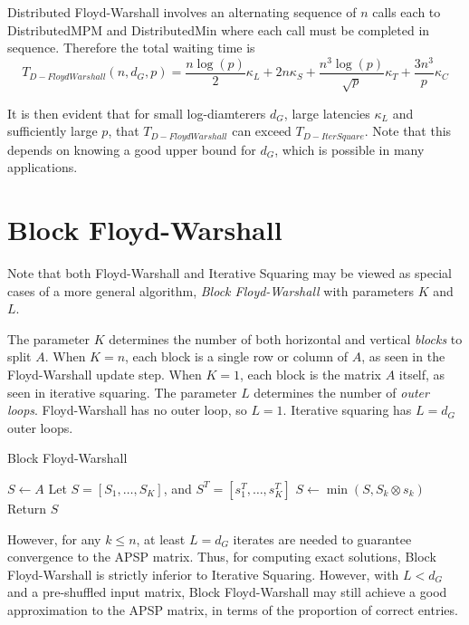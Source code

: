 \documentclass{article} %
\begin{document}
Distributed Floyd-Warshall involves an alternating sequence of $n$ calls each to {\sc DistributedMPM} and {\sc DistributedMin}
where each call must be completed in sequence.  Therefore the total waiting time is
\[
T_{D-FloydWarshall}(n, d_G, p) =  \frac{n \log(p)}{2}\kappa_L + 2n\kappa_S +  \frac{n^3\log(p)}{\sqrt{p}}\kappa_T + \frac{3n^3}{p}\kappa_C
\]

It is then evident that for small log-diamterers $d_G$, large
latencies $\kappa_L$ and sufficiently large $p$, that
$T_{D-FloydWarshall}$ can exceed $T_{D-IterSquare}$.  Note that this
depends on knowing a good upper bound for $d_G$, which is possible in
many applications.

\section{Block Floyd-Warshall}

Note that both Floyd-Warshall and Iterative Squaring may be viewed as
special cases of a more general algorithm, \emph{Block Floyd-Warshall}
with parameters $K$ and $L$.

The parameter $K$ determines the number of both horizontal and
vertical \emph{blocks} to split $A$.  When $K = n$, each block is a
single row or column of $A$, as seen in the Floyd-Warshall update
step.  When $K = 1$, each block is the matrix $A$ itself, as seen in
iterative squaring.  The parameter $L$ determines the number of
\emph{outer loops}.  Floyd-Warshall has no outer loop, so $L=1$.
Iterative squaring has $L = d_G$ outer loops.

\begin{algorithm}[H]
\caption{Block Floyd-Warshall}
\begin{algorithmic}
  \State $S \leftarrow A$
      \State Let $S = [S_1,\hdots, S_K]$, and $S^T = [s_1^T,\hdots, s_K^T]$
      \State $S \leftarrow \min(S,  S_k \otimes s_k)$
    \EndFor
  \EndFor
  \State Return $S$
\EndFunction
\end{algorithmic}
\end{algorithm}

However, for any $k \leq n$, at least $L = d_G$ iterates are needed to
guarantee convergence to the APSP matrix.  Thus, for computing exact
solutions, Block Floyd-Warshall is strictly inferior to Iterative
Squaring.  However, with $L < d_G$ and a pre-shuffled input matrix,
Block Floyd-Warshall may still achieve a good approximation to the
APSP matrix, in terms of the proportion of correct entries.
\end{document}

